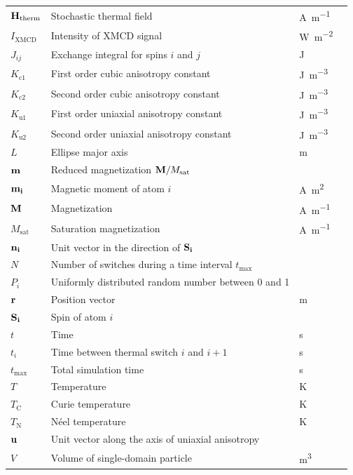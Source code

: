 \documentclass[11pt,a4paper,english,twoside]{article}
\begin{document}
\begin{longtable}{llll}
$\vb{H_\mathrm{therm}}$ & Stochastic thermal field & \si{\ampere\per\metre} \\
$I_\mathrm{XMCD}$ & Intensity of XMCD signal & \si{\watt\per\metre\squared} \\
$J_{ij}$ & Exchange integral for spins $i$ and $j$ & \si{\joule} \\
$K_\mathrm{c1}$ & First order cubic anisotropy constant & \si{\joule\per\metre\cubed} \\
$K_\mathrm{c2}$ & Second order cubic anisotropy constant & \si{\joule\per\metre\cubed} \\
$K_\mathrm{u1}$ & First order uniaxial anisotropy constant & \si{\joule\per\metre\cubed} \\
$K_\mathrm{u2}$ & Second order uniaxial anisotropy constant & \si{\joule\per\metre\cubed} \\
$L$ & Ellipse major axis & \si{\metre} \\
$\vb{m}$ & Reduced magnetization $\vb{M}/M_\mathrm{sat}$ &  \\
$\vb{m_i}$ & Magnetic moment of atom $i$ & \si{\ampere\metre\squared} \\
$\vb{M}$ & Magnetization & \si{\ampere\per\metre} \\
$M_\mathrm{sat}$ & Saturation magnetization & \si{\ampere\per\metre} \\
$\vb{n_i}$ & Unit vector in the direction of $\vb{S_i}$ &  \\
$N$ & Number of switches during a time interval $t_{\mathrm{max}}$ &  \\
$P_i$ & Uniformly distributed random number between 0 and 1 &  \\
$\vb{r}$ & Position vector & \si{\metre} \\
$\vb{S_i}$ & Spin of atom $i$ &  \\
$t$ & Time & \si{\second} \\
$t_i$ & Time between thermal switch $i$ and $i+1$ & \si{\second} \\
$t_{\mathrm{max}}$ & Total simulation time & \si{\second} \\
$T$ & Temperature & \si{\kelvin} \\
$T_\mathrm{C}$ & Curie temperature & \si{\kelvin} \\
$T_\mathrm{N}$ & N\'{e}el temperature & \si{\kelvin} \\
$\vb{u}$ & Unit vector along the axis of uniaxial anisotropy &  \\
$V$ & Volume of single-domain particle & \si{\metre\cubed} \\

\end{longtable}
\end{document}
